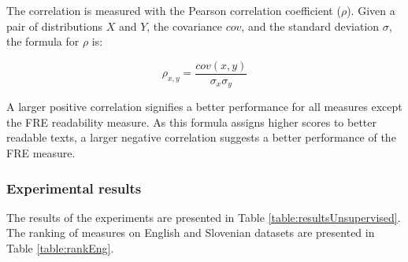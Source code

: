 \documentclass{clv3}
\begin{document}
The correlation is measured with the Pearson correlation coefficient ($\rho$). Given a pair of distributions $X$ and $Y$, the covariance $cov$, and the standard deviation $\sigma$, the formula for $\rho$ is:

\[ \rho_{x,y} = \frac{cov(x,y)}{\sigma_x  \sigma_y} \]

A larger positive correlation signifies a better performance for all measures except the FRE readability measure. As this formula assigns higher scores to better readable texts, a larger negative correlation suggests a better performance of the FRE measure. 

\subsubsection{Experimental results}
\label{sec-results-unsupervised}

The results of the experiments are presented in Table \ref{table:resultsUnsupervised}. The ranking of measures on English and Slovenian datasets are presented in Table \ref{table:rankEng}. 
\end{document}
